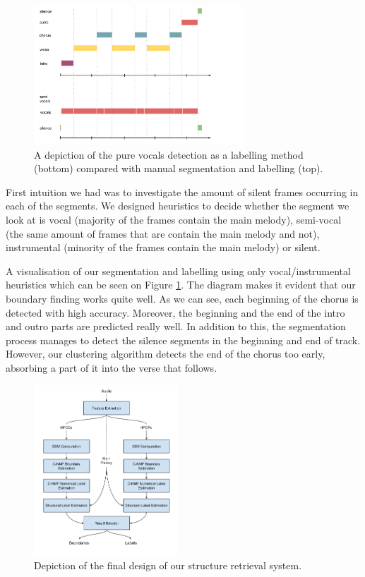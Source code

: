 \begin{figure}[h]
	\centering
   \includegraphics[width=0.7\textwidth]{Figures/BeatlesSegmentation}
\caption{A depiction of the pure vocals detection as a labelling method (bottom) compared with manual segmentation and labelling (top).}
\label{fig:vocalsimple}
\end{figure}

First intuition we had was to investigate the amount of silent frames occurring in each of the segments. We designed heuristics to decide whether the segment we look at is vocal (majority of the frames contain the main melody), semi-vocal (the same amount of frames that are contain the main melody and not), instrumental (minority of the frames contain the main melody) or silent. 

A visualisation of our segmentation and labelling using only vocal/instrumental heuristics which can be seen on Figure \ref{fig:vocalsimple}. The diagram makes it evident that our boundary finding works quite well. As we can see, each beginning of the chorus is detected with high accuracy. Moreover, the beginning and the end of the intro and outro parts are predicted really well. In addition to this, the segmentation process manages to detect the silence segments in the beginning and end of track. However, our clustering algorithm detects the end of the chorus too early, absorbing a part of it into the verse that follows.

\begin{figure}
\vspace{-30pt}
  \begin{center}
    \includegraphics[width=0.48\textwidth]{Figures/Structure-Retrieval}
  \end{center}
  \caption{Depiction of the final design of our structure retrieval system.}
\label{fig:NMF}
\end{figure}

